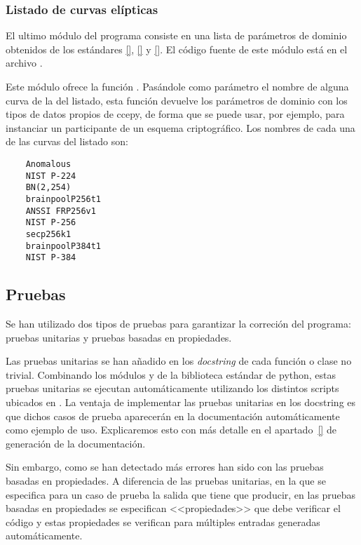 \subsubsection{Listado de curvas elípticas}
\label{subs:Listado de curvas elípticas}

El ultimo módulo del programa consiste en una lista de parámetros de dominio obtenidos de los estándares \ref{}, \ref{} y \ref{}. El código fuente de este módulo está en el archivo .

Este módulo ofrece la función . Pasándole como parámetro el nombre de alguna curva de la del listado, esta función devuelve los parámetros de dominio con los tipos de datos propios de ccepy, de forma que se puede usar, por ejemplo, para instanciar un participante de un esquema criptográfico. Los nombres de cada una de las curvas del listado son:
\begin{verbatim}
    Anomalous
    NIST P-224
    BN(2,254)
    brainpoolP256t1
    ANSSI FRP256v1
    NIST P-256
    secp256k1
    brainpoolP384t1
    NIST P-384
\end{verbatim}

\subsection{Pruebas}
\label{sub:Pruebas}

Se han utilizado dos tipos de pruebas para garantizar la correción del programa: pruebas unitarias y pruebas basadas en propiedades.

Las pruebas unitarias se han añadido en los \emph{docstring} de cada función o clase no trivial. Combinando los módulos  y  de la biblioteca estándar de python, estas pruebas unitarias se ejecutan automáticamente utilizando los distintos scripts ubicados en . La ventaja de implementar las pruebas unitarias en los docstring es que dichos casos de prueba aparecerán en la documentación automáticamente como ejemplo de uso. Explicaremos esto con más detalle en el apartado~\ref{} de generación de la documentación.

Sin embargo, como se han detectado más errores han sido con las pruebas basadas en propiedades. A diferencia de las pruebas unitarias, en la que se especifica para un caso de prueba la salida que tiene que producir, en las pruebas basadas en propiedades se especifican <<propiedades>> que debe verificar el código y estas propiedades se verifican para múltiples entradas generadas automáticamente.

